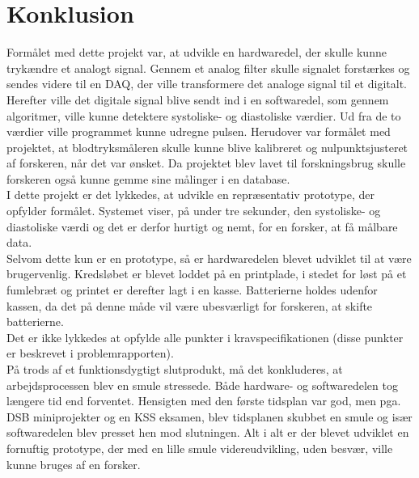 \chapter{Konklusion}
Formålet med dette projekt var, at udvikle en hardwaredel, der skulle kunne trykændre et analogt signal. Gennem et analog filter skulle signalet forstærkes og sendes videre til en DAQ, der ville transformere det analoge signal til et digitalt. Herefter ville det digitale signal blive sendt ind i en softwaredel, som gennem algoritmer, ville kunne detektere systoliske- og diastoliske værdier. Ud fra de to værdier ville programmet kunne udregne pulsen. Herudover var formålet med projektet, at blodtryksmåleren skulle kunne blive kalibreret og nulpunktsjusteret af forskeren, når det var ønsket. Da projektet blev lavet til forskningsbrug skulle forskeren også kunne gemme sine målinger i en database.\\
I dette projekt er det lykkedes, at udvikle en repræsentativ prototype, der opfylder formålet. Systemet viser, på under tre sekunder, den systoliske- og diastoliske værdi og det er derfor hurtigt og nemt, for en forsker, at få målbare data.\\
Selvom dette kun er en prototype, så er hardwaredelen blevet udviklet til at være brugervenlig. Kredsløbet er blevet loddet på en printplade, i stedet for løst på et fumlebræt og printet er derefter lagt i en kasse. Batterierne holdes udenfor kassen, da det på denne måde vil være ubesværligt for forskeren, at skifte batterierne.   \\
Det er ikke lykkedes at opfylde alle punkter i kravspecifikationen (disse punkter er beskrevet i problemrapporten). \\
På trods af et funktionsdygtigt slutprodukt, må det konkluderes, at arbejdsprocessen blev en smule stressede. Både hardware- og softwaredelen tog længere tid end forventet. Hensigten med den første tidsplan var god, men pga. DSB miniprojekter og en KSS eksamen, blev tidsplanen skubbet en smule og især softwaredelen blev presset hen mod slutningen. Alt i alt er der blevet udviklet en fornuftig prototype, der med en lille smule videreudvikling, uden besvær, ville kunne bruges af en forsker. \\

